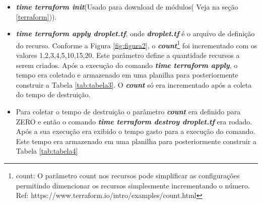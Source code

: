 \begin{itemize}
    \item \textbf{\textit{time terraform init}}(Usado para download de módulos( Veja na seção \ref{terraform})).
    \item \textbf{\textit{time terraform apply droplet.tf}}, onde \textbf{\textit{droplet.tf}} é o arquivo de definição do recurso. Conforme a Figura \ref{fig:figura2}, o \textbf{\textit{count}}\footnote{count: O parâmetro count nos recursos pode simplificar as configurações permitindo dimencionar os recursos simplesmente incrementando o número. Ref: https://www.terraform.io/intro/examples/count.html }  foi incrementado com os valores 1,2,3,4,5,10,15,20. Este parâmetro define a quantidade recursos a serem criados. Após a execução do comando \textbf{\textit{time terraform apply}}, o tempo era coletado e armazenado em uma planilha para posteriormente construir a Tabela \ref{tab:tabela3}. 
    O \textbf{\textit{count}} só era incrementado após a coleta do tempo de destruição. 
    \item Para coletar o tempo de destruição o parâmetro \textbf{\textit{count}} era definido para ZERO e então o comando \textbf{\textit{time terraform destroy droplet.tf}} era rodado. Após a sua execução era exibido o tempo gasto para a execução do comando. Este tempo era armazenado em uma planilha para posteriormente construir a Tabela \ref{tab:tabela4}
\end{itemize}


